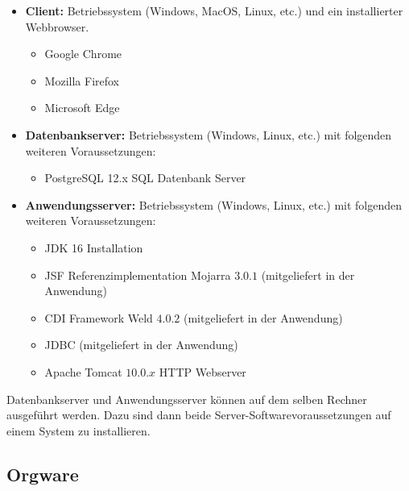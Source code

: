 \begin{itemize}

	\item \textbf{Client:} Betriebssystem (Windows, MacOS, Linux, etc.) und ein installierter Webbrowser.

	\begin{itemize}
		\item Google Chrome
		\item Mozilla Firefox
		\item Microsoft Edge
	\end{itemize}

	\item \textbf{Datenbankserver:} Betriebssystem (Windows, Linux, etc.) mit folgenden weiteren Voraussetzungen:

	\begin{itemize}
		\item PostgreSQL 12.x SQL Datenbank Server
	\end{itemize}

	\item \textbf{Anwendungsserver:} Betriebssystem (Windows, Linux, etc.) mit folgenden weiteren Voraussetzungen:

	\begin{itemize}
		\item JDK 16 Installation
		\item JSF Referenzimplementation Mojarra $3.0.1$ (mitgeliefert in der Anwendung)
		\item CDI Framework Weld $4.0.2$ (mitgeliefert in der Anwendung)
		\item JDBC (mitgeliefert in der Anwendung)
		\item Apache Tomcat $10.0.x$ HTTP Webserver
	\end{itemize}

\end{itemize}

	Datenbankserver und Anwendungsserver können auf dem selben Rechner ausgeführt werden. Dazu sind dann beide Server-Softwarevoraussetzungen auf einem System zu installieren.

\subsection{Orgware}

